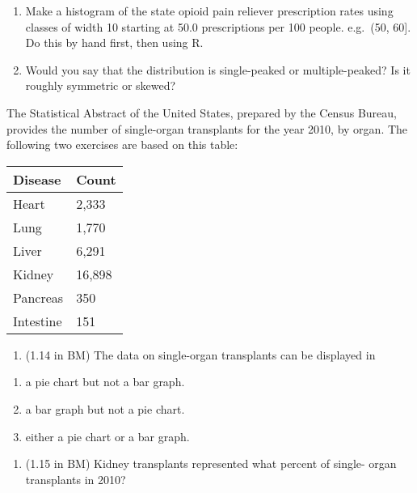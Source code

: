 \documentclass[
  letterpaper,
  DIV=11,
  numbers=noendperiod]{scrreprt}
\providecommand{\tightlist}{%
  \setlength{\itemsep}{0pt}\setlength{\parskip}{0pt}}\usepackage{longtable,booktabs,array}
\begin{document}
\begin{enumerate}
\def\labelenumi{\alph{enumi}.}
\tightlist
\item
  Make a histogram of the state opioid pain reliever prescription rates
  using classes of width 10 starting at 50.0 prescriptions per 100
  people. e.g.~(50, 60{]}. Do this by hand first, then using R.
\item
  Would you say that the distribution is single-peaked or
  multiple-peaked? Is it roughly symmetric or skewed?
\end{enumerate}

The Statistical Abstract of the United States, prepared by the Census
Bureau, provides the number of single-organ transplants for the year
2010, by organ. The following two exercises are based on this table:

\begin{longtable}[]{@{}ll@{}}
\toprule\noalign{}
Disease & Count \\
\midrule\noalign{}
\endhead
\bottomrule\noalign{}
\endlastfoot
Heart & 2,333 \\
Lung & 1,770 \\
Liver & 6,291 \\
Kidney & 16,898 \\
Pancreas & 350 \\
Intestine & 151 \\
\end{longtable}

\begin{enumerate}
\def\labelenumi{\arabic{enumi}.}
\setcounter{enumi}{1}
\tightlist
\item
  (1.14 in BM) The data on single-organ transplants can be displayed in
\end{enumerate}

\begin{enumerate}
\def\labelenumi{\alph{enumi}.}
\tightlist
\item
  a pie chart but not a bar graph.
\item
  a bar graph but not a pie chart.
\item
  either a pie chart or a bar graph.
\end{enumerate}

\begin{enumerate}
\def\labelenumi{\arabic{enumi}.}
\setcounter{enumi}{2}
\tightlist
\item
  (1.15 in BM) Kidney transplants represented what percent of single-
  organ transplants in 2010?
\end{enumerate}
\end{document}
